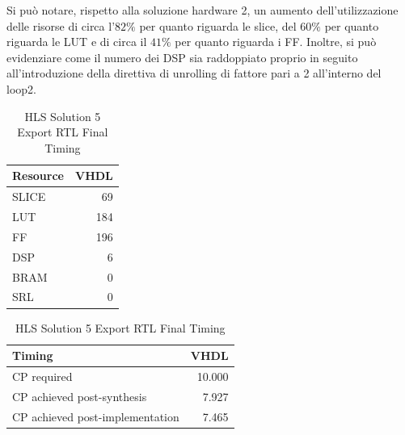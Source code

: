 Si può notare, rispetto alla soluzione hardware 2, un aumento dell'utilizzazione delle risorse di circa l'$82\%$ per quanto riguarda le slice, del $60\%$ per quanto riguarda le LUT e di circa il $41\%$ per quanto riguarda i FF. Inoltre, si può evidenziare come il numero dei DSP sia raddoppiato proprio in seguito all'introduzione della direttiva di unrolling di fattore pari a 2 all'interno del loop2.

\begin{table}[H]
	\centering
	\begin{minipage}[t]{0.45\linewidth}
		\centering
		\begin{tabular}{|l|r|}
			\hline
			\textbf{Resource} & \textbf{VHDL} \\
			\hline
			SLICE & 69 \\
			\hline
			LUT & 184 \\
			\hline
			FF & 196 \\
			\hline
			DSP & 6 \\
			\hline
			BRAM & 0 \\
			\hline
			SRL & 0 \\
			\hline
		\end{tabular}
		\caption{HLS Solution 5 Export RTL Resource Usage}
		\label{tab:hls-solution-5-export-rtl-resoruce-usage}
	\end{minipage}
	\hfill
	\begin{minipage}[t]{0.45\linewidth}
		\centering
		\begin{tabular}{|l|r|}
			\hline
			\textbf{Timing} & \textbf{VHDL} \\
			\hline
			CP required & 10.000 \\
			\hline
			CP achieved post-synthesis & 7.927 \\
			\hline
			CP achieved post-implementation & 7.465 \\
			\hline
		\end{tabular}
		\caption{HLS Solution 5 Export RTL Final Timing}
		\label{tab:hls-solution-5-export-rtl-final-timing}
	\end{minipage}
\end{table}